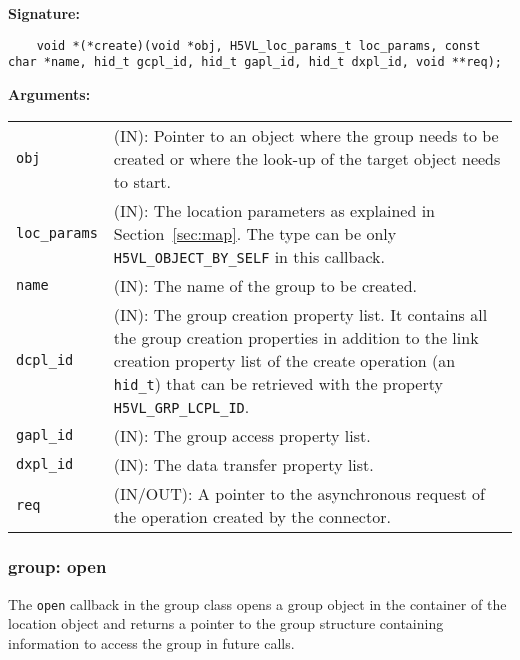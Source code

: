 \begin{mdframed}[style=bgbox]
\textbf{Signature:}
\begin{lstlisting}
    void *(*create)(void *obj, H5VL_loc_params_t loc_params, const char *name, hid_t gcpl_id, hid_t gapl_id, hid_t dxpl_id, void **req);
\end{lstlisting}

\textbf{Arguments:}\\
\begin{tabular}{l p{13.5cm}}
  \texttt{obj} & (IN): Pointer to an object where the group needs
  to be created or where the look-up of the target object needs to
  start.\\
  \texttt{loc\_params} & (IN): The location parameters as explained in
  Section~\ref{sec:map}. The type can be only \texttt{H5VL\_OBJECT\_BY\_SELF} in this callback. \\
  \texttt{name} & (IN): The name of the group to be created.\\
  \texttt{dcpl\_id} & (IN): The group creation property list. It contains
  all the group creation properties in addition to the link creation
  property list of the create operation (an \texttt{hid\_t}) that can be
  retrieved with the property \texttt{H5VL\_GRP\_LCPL\_ID}.\\
  \texttt{gapl\_id} & (IN): The group access property list.\\
  \texttt{dxpl\_id} & (IN): The data transfer property list.\\
  \texttt{req} & (IN/OUT): A pointer to the asynchronous request of the
  operation created by the connector.\\
\end{tabular}
\end{mdframed}

\subsubsection{group: open}
The \texttt{open} callback in the group class opens a group object
in the container of the location object and returns a pointer to the
group structure containing information to access the group in future
calls.\bigskip

